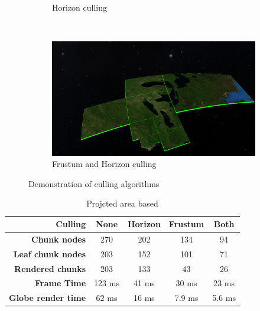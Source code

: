 \begin{figure}[h]
\begin{subfigure}[bt]{0.48\textwidth}
        \caption{Horizon culling}
    \end{subfigure}
    ~
    \begin{subfigure}[bt]{0.48\textwidth}
        \includegraphics[width=\textwidth]{figures/results/culling/afh.png}
        \caption{Frustum and Horizon culling}
    \end{subfigure}
    \caption{Demonstration of culling algorithms}
    \label{fig:cullinga}
\end{figure}

\begin{table}[h]
\centering
\caption[]{Projcted area based}
  \label{table:cullinga}
  \begin{tabular}{| r | c c c c |}
    \hline
      \textbf{Culling}            & \textbf{None} & \textbf{Horizon}  & \textbf{Frustum}  & \textbf{Both} \\ \hline
      \textbf{Chunk nodes}        & 270           & 202               & 134               & 94 \\ 
      \textbf{Leaf chunk nodes}   & 203           & 152               & 101               & 71 \\ 
      \textbf{Rendered chunks}    & 203           & 133               & 43                & 26 \\
      \textbf{Frame Time}         & 123 ms        & 41 ms             & 30 ms             & 23 ms \\
      \textbf{Globe render time}  & 62 ms         & 16 ms             & 7.9 ms            & 5.6 ms \\
    \hline
  \end{tabular}
\end{table}

\clearpage
